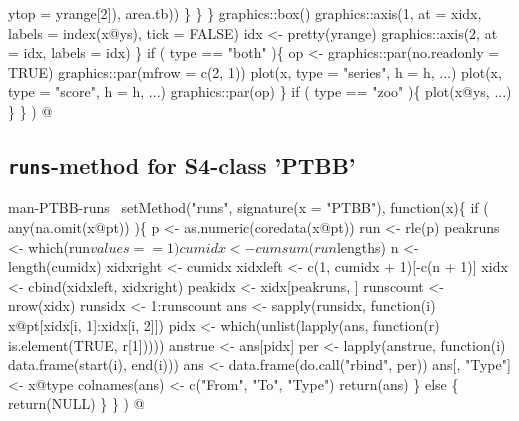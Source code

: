 \documentclass[a4paper]{article}
\begin{document}
                                                       ytop = yrange[2]),
                                                  area.tb))
                    \}
                \}
            \}
            graphics::box()
            graphics::axis(1, at = xidx, labels = index(x@ys),
                           tick = FALSE)
            idx <- pretty(yrange)
            graphics::axis(2, at = idx, labels = idx)
        \}
        if ( type == "both" )\{
            op <- graphics::par(no.readonly = TRUE)
            graphics::par(mfrow = c(2, 1))
            plot(x, type = "series", h = h, ...)
            plot(x, type = "score", h = h, ...)
            graphics::par(op)
        \}
        if ( type == "zoo" )\{
            plot(x@ys, ...)
        \}
    \}
)
\nwendcode{}@

\subsection{\texttt{runs}-method for S4-class 'PTBB'}

\nwenddocs{}\endmoddef\let\nwnotused=\nwoutput{}
\LA{}man-PTBB-runs~{\nwtagstyle{}}\RA{}
setMethod("runs",
          signature(x = "PTBB"), function(x)\{
              if ( any(na.omit(x@pt)) )\{
                  p <- as.numeric(coredata(x@pt))
                  run <- rle(p)
                  peakruns <- which(run$values == 1)
                  cumidx <- cumsum(run$lengths)
                  n <- length(cumidx)
                  xidxright <- cumidx
                  xidxleft <- c(1, cumidx + 1)[-c(n + 1)]
                  xidx <- cbind(xidxleft, xidxright)
                  peakidx <- xidx[peakruns, ]
                  runscount <- nrow(xidx)
                  runsidx <- 1:runscount
                  ans <- sapply(runsidx, function(i)
                      x@pt[xidx[i, 1]:xidx[i, 2]])
                  pidx <- which(unlist(lapply(ans, function(r)
                      is.element(TRUE, r[1]))))
                  anstrue <- ans[pidx]
                  per <- lapply(anstrue, function(i)
                      data.frame(start(i), end(i)))
                  ans <- data.frame(do.call("rbind", per))
                  ans[, "Type"] <- x@type
                  colnames(ans) <- c("From", "To", "Type")
                  return(ans)
              \} else \{
                  return(NULL)
              \}
          \}
)
\nwnotused{PtbbMethods.R}\nwendcode{}@
\end{document}
